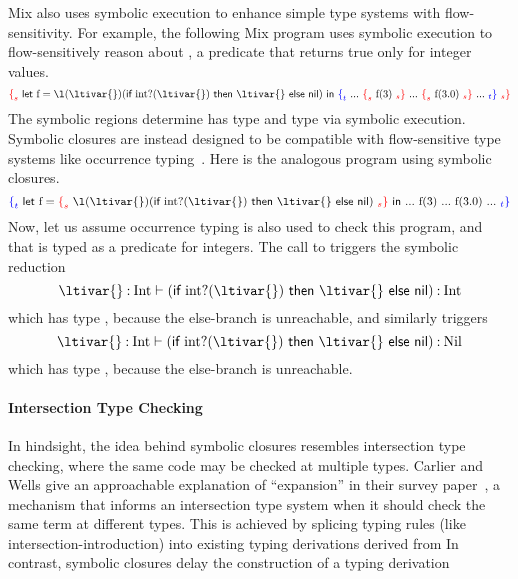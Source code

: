 \documentclass[11pt]{iuthesis}
\begin{document}
Mix also uses symbolic execution to enhance simple type systems with flow-sensitivity.
For example, the following Mix program uses symbolic execution 
to flow-sensitively reason about , a predicate that returns true only for integer values.
%
\[
\MixSregion{\ltilet{\text{f}}{\ltiufun{\ltivar{}}{(\ltiif{\ltiapp{\text{int?}}{\ltivar{}}}{\ltivar{}}{\textsf{nil}})}}
                  {\MixTregion{  ...\ \MixSregion{\ltiapp{\text{f}}{3}}
                               \ ...\ \MixSregion{\ltiapp{\text{f}}{3.0}}
                               \ ... }}}
\]
%
The symbolic regions determine
 has type  and
 type  via symbolic execution.
Symbolic closures are instead designed to be compatible with flow-sensitive type systems like occurrence typing~\cite{TF10}.
Here is the analogous program using symbolic closures.
%
\[
\MixTregion{\ltilet{\text{f}}{\MixSregion{\ltiufun{\ltivar{}}{(\ltiif{\ltiapp{\text{int?}}{\ltivar{}}}{\ltivar{}}{\textsf{nil}})}}}
                  {  ...\ {\ltiapp{\text{f}}{3}}
                               \ ...\ {\ltiapp{\text{f}}{3.0}}
                               \ ... }}
\]
%
Now, let us assume occurrence typing is also used to check this program, and
that  is typed as a predicate for integers.
The call to
{}
triggers the symbolic reduction
%
\[
\ltitjudgementNoElab{\hastype{\ltivar{}}{\text{Int}}}
                    {(\ltiif{\ltiapp{\text{int?}}{\ltivar{}}}{\ltivar{}}{\textsf{nil}})}
                    {\text{Int}}
\]
%
which has type , because the else-branch is unreachable, and 
similarly {} triggers
%
\[
\ltitjudgementNoElab{\hastype{\ltivar{}}{\text{Int}}}
                    {(\ltiif{\ltiapp{\text{int?}}{\ltivar{}}}{\ltivar{}}{\textsf{nil}})}
                    {\text{Nil}}
\]
%
which has type , because the else-branch is unreachable.





\paragraph{Intersection Type Checking}
In hindsight, the idea behind symbolic closures resembles intersection type checking,
where the same code may be checked at multiple types.
Carlier and Wells give an approachable explanation of ``expansion'' in their survey paper~\cite{carlier2005expansion},
a mechanism that informs an intersection type system when it should
check the same term at different types.
This is achieved by splicing typing rules (like intersection-introduction) into existing typing
derivations derived from 
In contrast, symbolic closures delay the construction of a typing derivation 
\end{document}

